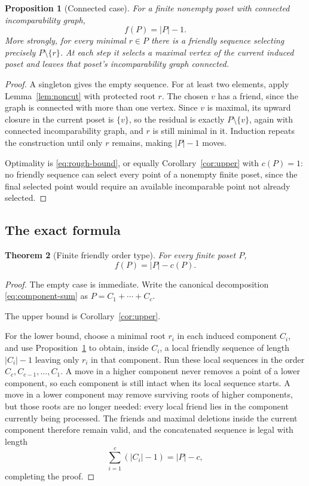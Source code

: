 \documentclass[11pt,letterpaper]{article}
\newtheorem{theorem}{Theorem}[section]
\newtheorem{proposition}[theorem]{Proposition}
\theoremstyle{definition}
\theoremstyle{remark}
\begin{document}
\begin{proposition}[Connected case]\label{prop:connected}
For a finite nonempty poset with connected incomparability graph,
\[
 f(P)=|P|-1.
\]
More strongly, for every minimal $r\in P$ there is a friendly sequence
selecting precisely $P\setminus\{r\}$. At each step it selects a maximal
vertex of the current induced poset and leaves that poset's incomparability
graph connected.
\end{proposition}
\begin{proof}
A singleton gives the empty sequence. For at least two elements, apply
Lemma~\ref{lem:noncut} with protected root $r$. The chosen $v$ has a friend,
since the graph is connected with more than one vertex. Since $v$ is maximal,
its upward closure in the current poset is $\{v\}$, so the residual is
exactly $P\setminus\{v\}$, again with connected incomparability graph, and
$r$ is still minimal in it. Induction repeats the construction until only
$r$ remains, making $|P|-1$ moves.

Optimality is \eqref{eq:rough-bound}, or equally
Corollary~\ref{cor:upper} with $c(P)=1$: no friendly sequence can select
every point of a nonempty finite poset, since the final selected point would
require an available incomparable point not already selected.
\end{proof}

\subsection{The exact formula}

\begin{theorem}[Finite friendly order type]\label{thm:finite}
For every finite poset $P$,
\begin{equation}\label{eq:finite-formula}
 \boxed{f(P)=|P|-c(P).}
\end{equation}
\end{theorem}
\begin{proof}
The empty case is immediate. Write the canonical decomposition
\eqref{eq:component-sum} as $P=C_1+\cdots+C_c$.

The upper bound is Corollary~\ref{cor:upper}.

For the lower bound, choose a minimal root $r_i$ in each induced component
$C_i$, and use Proposition~\ref{prop:connected} to obtain, inside $C_i$, a
local friendly sequence of length $|C_i|-1$ leaving only $r_i$ in that
component. Run these local sequences in the order $C_c,C_{c-1},\ldots,C_1$.
A move in a higher component never removes a point of a lower component, so
each component is still intact when its local sequence starts. A move in a
lower component may remove surviving roots of higher components, but those
roots are no longer needed: every local friend lies in the component
currently being processed. The friends and maximal deletions inside the
current component therefore remain valid, and the concatenated sequence is
legal with length
\[
 \sum_{i=1}^c(|C_i|-1)=|P|-c,
\]
completing the proof.
\end{proof}
\end{document}
